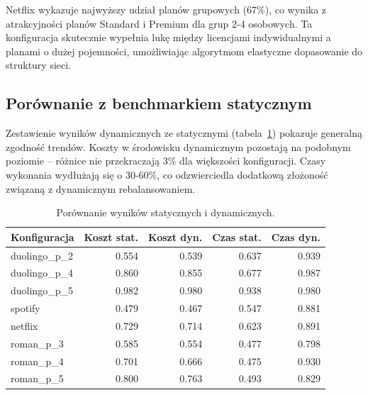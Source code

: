 Netflix wykazuje najwyższy udział planów grupowych (67\%), co wynika z atrakcyjności planów Standard i Premium dla grup 2-4 osobowych. Ta konfiguracja skutecznie wypełnia lukę między licencjami indywidualnymi a planami o dużej pojemności, umożliwiając algorytmom elastyczne dopasowanie do struktury sieci.

\subsection{Porównanie z benchmarkiem statycznym}

Zestawienie wyników dynamicznych ze statycznymi (tabela~\ref{tab:ext-static-dynamic-comparison}) pokazuje generalną zgodność trendów. Koszty w środowisku dynamicznym pozostają na podobnym poziomie -- różnice nie przekraczają 3\% dla większości konfiguracji. Czasy wykonania wydłużają się o 30-60\%, co odzwierciedla dodatkową złożoność związaną z dynamicznym rebalansowaniem.

\begin{table}[H]
  \centering
  \caption{Porównanie wyników statycznych i dynamicznych.}
  \label{tab:ext-static-dynamic-comparison}
  \begin{tabular}{lrrrr}
    \toprule
    \textbf{Konfiguracja} & \textbf{Koszt stat.} & \textbf{Koszt dyn.} & \textbf{Czas stat.} & \textbf{Czas dyn.} \\
    \midrule
    duolingo\_p\_2        & 0.554                & 0.539               & 0.637               & 0.939              \\
    duolingo\_p\_4        & 0.860                & 0.855               & 0.677               & 0.987              \\
    duolingo\_p\_5        & 0.982                & 0.980               & 0.938               & 0.980              \\
    spotify               & 0.479                & 0.467               & 0.547               & 0.881              \\
    netflix               & 0.729                & 0.714               & 0.623               & 0.891              \\
    roman\_p\_3           & 0.585                & 0.554               & 0.477               & 0.798              \\
    roman\_p\_4           & 0.701                & 0.666               & 0.475               & 0.930              \\
    roman\_p\_5           & 0.800                & 0.763               & 0.493               & 0.829              \\
    \bottomrule
  \end{tabular}
\end{table}

